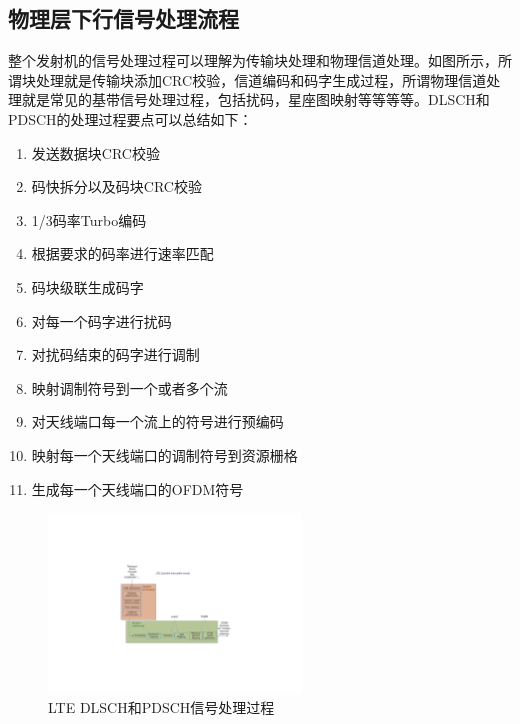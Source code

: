 \documentclass[10pt,a4paper,UTF8]{article}
\begin{document}
\subsection{物理层下行信号处理流程}
\label{sec:orgheadline34}


整个发射机的信号处理过程可以理解为传输块处理和物理信道处理。如图所示，所谓块处理就是传输块添加CRC校验，信道编码和码字生成过程，所谓物理信道处理就是常见的基带信号处理过程，包括扰码，星座图映射等等等等。DLSCH和PDSCH的处理过程要点可以总结如下：

\begin{enumerate}
\item 发送数据块CRC校验
\item 码快拆分以及码块CRC校验
\item 1/3码率Turbo编码
\item 根据要求的码率进行速率匹配
\item 码块级联生成码字
\item 对每一个码字进行扰码
\item 对扰码结束的码字进行调制
\item 映射调制符号到一个或者多个流
\item 对天线端口每一个流上的符号进行预编码
\item 映射每一个天线端口的调制符号到资源栅格
\item 生成每一个天线端口的OFDM符号
\end{enumerate}

\begin{figure}[htb]
\centering
\includegraphics[width=0.6\textwidth]{../../img/20151107ltedlschpdsch.pdf}
\caption{\label{fig:orgparagraph16}
LTE DLSCH和PDSCH信号处理过程}
\end{figure}
\end{document}
